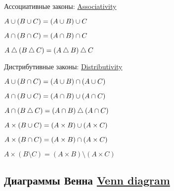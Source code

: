 \documentclass[a4paper,10pt]{article}
\begin{document}
\begin{multicols}{2}
\begin{terms}
    \item Ассоциативные законы:
    \hfill\href{https://en.wikipedia.org/wiki/Associative_property}{Associativity}
    \begin{terms}
        \item $A \cup (B \cup C) = (A \cup B) \cup C$
        \item $A \cap (B \cap C) = (A \cap B) \cap C$
        \item $A \mathbin{\triangle} (B \mathbin{\triangle} C) = (A \mathbin{\triangle} B) \mathbin{\triangle} C$
    \end{terms}

    \item Дистрибутивные законы:
    \hfill\href{https://en.wikipedia.org/wiki/Distributive_property}{Distributivity}
    \begin{terms}
        \item $A \cup (B \cap C) = (A \cup B) \cap (A \cup C)$
        \item $A \cap (B \cup C) = (A \cap B) \cup (A \cap C)$
        \item $A \cap (B \mathbin{\triangle} C) = (A \cap B) \mathbin{\triangle} (A \cap C)$
        \item $A \times (B \cup C) = (A \times B) \cup (A \times C)$
        \item $A \times (B \cap C) = (A \times B) \cap (A \times C)$
        \item $A \times (B \setminus C) = (A \times B) \setminus (A \times C)$
    \end{terms}
\end{terms}
\end{multicols}



\subsection{Диаграммы Венна%
\texorpdfstring{\hfill\normalfont\href{https://en.wikipedia.org/wiki/Venn_diagram}{Venn diagram}}{}}

\def\firstcircle{(0,0) circle[radius=1]}
\def\secondcircle{(1.2,0) circle[radius=1]}
\newcommand\drawcircles[1][]{%
    \draw[outline,#1]
        \firstcircle  node[left]  {$A$}
        \secondcircle node[right] {$B$}; }
\newcommand\drawuniverse[1][]{%
    \draw[universe,#1] (-1.1,-1.1) rectangle (2.3,1.6); }
\newcommand\drawlabel[1]{%
    \node[above] at (current bounding box.north) {#1}; }
\end{document}
